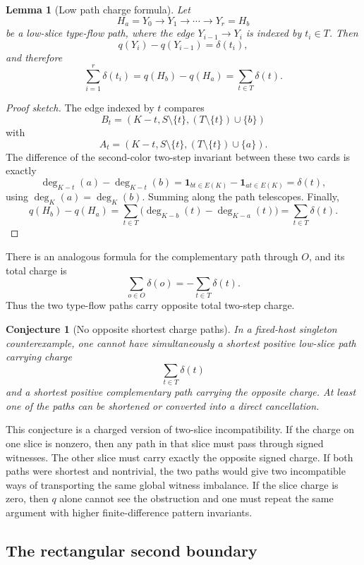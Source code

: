 \documentclass[11pt]{article}
\newtheorem{lemma}{Lemma}
\newtheorem{conjecture}{Conjecture}
\newcommand{\one}{\mathbf{1}}
\begin{document}
\begin{lemma}[Low path charge formula]
Let
\[
  H_a=Y_0\to Y_1\to\cdots\to Y_r=H_b
\]
be a low-slice type-flow path, where the edge \(Y_{i-1}\to Y_i\) is indexed
by \(t_i\in T\).  Then
\[
  q(Y_i)-q(Y_{i-1})=\delta(t_i),
\]
and therefore
\[
  \sum_{i=1}^r \delta(t_i)
  =
  q(H_b)-q(H_a)
  =
  \sum_{t\in T}\delta(t).
\]
\end{lemma}

\begin{proof}[Proof sketch]
The edge indexed by \(t\) compares
\[
  B_t=(K-t,S\setminus\{t\},(T\setminus\{t\})\cup\{b\})
\]
with
\[
  A_t=(K-t,S\setminus\{t\},(T\setminus\{t\})\cup\{a\}).
\]
The difference of the second-color two-step invariant between these two cards
is exactly
\[
  \deg_{K-t}(a)-\deg_{K-t}(b)
  =
  \one_{bt\in E(K)}-\one_{at\in E(K)}
  =
  \delta(t),
\]
using \(\deg_K(a)=\deg_K(b)\).  Summing along the path telescopes.  Finally,
\[
  q(H_b)-q(H_a)
  =
  \sum_{t\in T}\bigl(\deg_{K-b}(t)-\deg_{K-a}(t)\bigr)
  =
  \sum_{t\in T}\delta(t).
\]
\end{proof}

There is an analogous formula for the complementary path through \(O\), and
its total charge is
\[
  \sum_{o\in O}\delta(o)
  =
  -\sum_{t\in T}\delta(t).
\]
Thus the two type-flow paths carry opposite total two-step charge.

\begin{conjecture}[No opposite shortest charge paths]
In a fixed-host singleton counterexample, one cannot have simultaneously a
shortest positive low-slice path carrying charge
\[
  \sum_{t\in T}\delta(t)
\]
and a shortest positive complementary path carrying the opposite charge.  At
least one of the paths can be shortened or converted into a direct
cancellation.
\end{conjecture}

This conjecture is a charged version of two-slice incompatibility.  If the
charge on one slice is nonzero, then any path in that slice must pass through
signed witnesses.  The other slice must carry exactly the opposite signed
charge.  If both paths were shortest and nontrivial, the two paths would give
two incompatible ways of transporting the same global witness imbalance.  If
the slice charge is zero, then \(q\) alone cannot see the obstruction and one
must repeat the same argument with higher finite-difference pattern
invariants.

\subsection{The rectangular second boundary}
\end{document}
